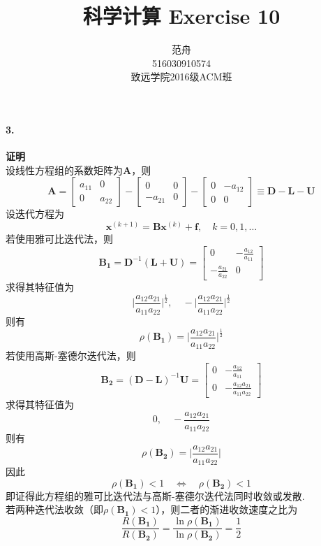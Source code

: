 

\title{科学计算 Exercise 10}
\author{范舟\\516030910574\\致远学院2016级ACM班}
\date{}


\maketitle

\paragraph{3.} \textbf{证明} \\
设线性方程组的系数矩阵为$\mathbf{A}$，则
\[\mathbf{A} = \begin{bmatrix}
a_{11} & 0\\ 
0 & a_{22}
\end{bmatrix} - \begin{bmatrix}
0 & 0\\ 
-a_{21} & 0
\end{bmatrix} - \begin{bmatrix}
0 & -a_{12}\\ 
0 & 0
\end{bmatrix} \equiv \mathbf{D} - \mathbf{L} - \mathbf{U}\]
设迭代方程为
\[\mathbf{x}^{(k + 1)} = \mathbf{B}\mathbf{x}^{(k)} + \mathbf{f}, \quad k = 0, 1, \dots\]
若使用雅可比迭代法，则
\[\mathbf{B_1} = \mathbf{D}^{-1}(\mathbf{L} + \mathbf{U}) = \begin{bmatrix}
0 & -\frac{a_{12}}{a_{11}}\\ 
-\frac{a_{21}}{a_{22}} & 0
\end{bmatrix}\]
求得其特征值为
\[\bigg|\frac{a_{12}a_{21}}{a_{11}a_{22}}\bigg|^{\frac{1}{2}}, \quad -\bigg|\frac{a_{12}a_{21}}{a_{11}a_{22}}\bigg|^{\frac{1}{2}}\]
则有
\[\rho(\mathbf{B_1}) = \bigg|\frac{a_{12}a_{21}}{a_{11}a_{22}}\bigg|^{\frac{1}{2}}\]
若使用高斯-塞德尔迭代法，则
\[\mathbf{B_2} = (\mathbf{D} - \mathbf{L})^{-1}\mathbf{U} = \begin{bmatrix}
0 & -\frac{a_{12}}{a_{11}}\\ 
0 & -\frac{a_{12}a_{21}}{a_{11}a_{22}}
\end{bmatrix}\]
求得其特征值为
\[0, \quad -\frac{a_{12}a_{21}}{a_{11}a_{22}}\]
则有
\[\rho(\mathbf{B_2}) = \bigg|\frac{a_{12}a_{21}}{a_{11}a_{22}}\bigg|\]
因此
\[\rho(\mathbf{B_1}) < 1 \quad \Leftrightarrow \quad \rho(\mathbf{B_2}) < 1\]
即证得此方程组的雅可比迭代法与高斯-塞德尔迭代法同时收敛或发散. \\
若两种迭代法收敛（即$\rho(\mathbf{B_1}) < 1$），则二者的渐进收敛速度之比为
\[\frac{R(\mathbf{B_1})}{R(\mathbf{B_2})} = \frac{\ln \rho(\mathbf{B_1})}{\ln \rho(\mathbf{B_2})} = \frac{1}{2}\]
\newline

